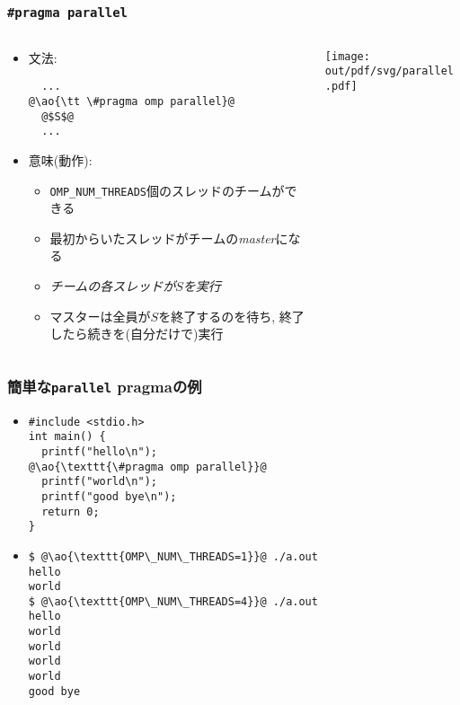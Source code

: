 \documentclass[10pt,dvipdfmx]{beamer}
\newcommand{\ao}[1]{{\color{blue}#1}}
\newcommand{\aka}[1]{{\color{red}#1}}
\begin{document}
\begin{frame}[fragile]
\frametitle{{\tt \#pragma parallel}}
\begin{columns}
  \begin{column}{0.6\textwidth}
\begin{itemize}
\item 文法:
\begin{lstlisting}
  ...
@\ao{\tt \#pragma omp parallel}@
  @$S$@
  ...
\end{lstlisting}
\item 意味(動作): 
  \begin{itemize}
  \item {\tt OMP\_NUM\_THREADS}個の\ao{スレッド}のチームができる
  \item 最初からいたスレッドがチームの{\em master}になる
  \item \aka{\em チームの各スレッドが$S$を実行}
  \item マスターは全員が$S$を終了するのを待ち, 終了したら続きを(自分だけで)実行
  \end{itemize}
\end{itemize}
  \end{column}

  \begin{column}{0.4\textwidth}
\texttt{[image: out/pdf/svg/parallel.pdf]}
  \end{column}
\end{columns}
\end{frame}


\begin{frame}[fragile]
\frametitle{簡単な{\tt parallel} pragmaの例}

\begin{itemize}
\item []
\begin{lstlisting}
#include <stdio.h>
int main() {
  printf("hello\n");
@\ao{\texttt{\#pragma omp parallel}}@
  printf("world\n");
  printf("good bye\n");
  return 0;
}
\end{lstlisting}

\item []
\begin{lstlisting}
$ @\ao{\texttt{OMP\_NUM\_THREADS=1}}@ ./a.out
hello
world
$ @\ao{\texttt{OMP\_NUM\_THREADS=4}}@ ./a.out
hello
world
world
world
world
good bye
\end{lstlisting}
\end{itemize}
\end{frame}
\end{document}
